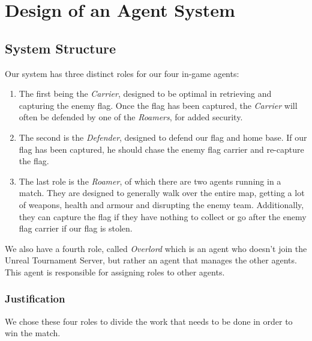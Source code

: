 \chapter{Design of an Agent System}
\section{System Structure}
Our system has three distinct roles for our four in-game agents:

\begin{enumerate}
\item The first being the \emph{Carrier}, designed to be optimal in retrieving and capturing the enemy flag. Once the flag has been captured, the \emph{Carrier} will often be defended by one of the \emph{Roamers}, for added security.

\item The second is the \emph{Defender}, designed to defend our flag and home base. If our flag has been captured, he should chase the enemy flag carrier and re-capture the flag.

\item The last role is the \emph{Roamer}, of which there are two agents running in a match. They are designed to generally walk over the entire map, getting a lot of weapons, health and armour and disrupting the enemy team. Additionally, they can capture the flag if they have nothing to collect or go after the enemy flag carrier if our flag is stolen.
\end{enumerate}

We also have a fourth role, called \emph{Overlord} which is an agent who doesn't join the Unreal Tournament Server, but rather an agent that manages the other agents. This agent is responsible for assigning roles to other agents.

\subsection{Justification}
We chose these four roles to divide the work that needs to be done in order to win the match.

